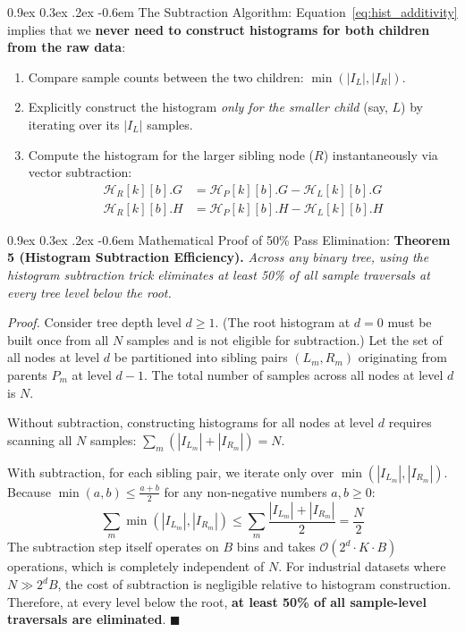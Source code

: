 \documentclass[11pt,a4paper]{article}
\makeatletter
\renewcommand\paragraph{\@startsection{paragraph}{4}{\z@}%
                                     {0.9ex \@plus0.3ex \@minus.2ex}%
                                     {-0.6em}%
                                     {\normalfont\normalsize\bfseries}}
\makeatother
\begin{document}
\paragraph{The Subtraction Algorithm:}
Equation~\eqref{eq:hist_additivity} implies that we \textbf{never need to construct histograms for both children from the raw data}:
\begin{enumerate}
    \item Compare sample counts between the two children: $\min(|I_L|, |I_R|)$.
    \item Explicitly construct the histogram \emph{only for the smaller child} (say, $L$) by iterating over its $|I_L|$ samples.
    \item Compute the histogram for the larger sibling node ($R$) instantaneously via vector subtraction:
    \begin{align}
        \mathcal{H}_R[k][b].G &= \mathcal{H}_P[k][b].G - \mathcal{H}_L[k][b].G \nonumber \\
        \mathcal{H}_R[k][b].H &= \mathcal{H}_P[k][b].H - \mathcal{H}_L[k][b].H
    \end{align}
\end{enumerate}

\paragraph{Mathematical Proof of 50\% Pass Elimination:}
\textbf{Theorem 5 (Histogram Subtraction Efficiency).} \emph{Across any binary tree, using the histogram subtraction trick eliminates at least 50\% of all sample traversals at every tree level below the root.}

\emph{Proof.} Consider tree depth level $d \ge 1$. (The root histogram at $d = 0$ must be built once from all $N$ samples and is not eligible for subtraction.) Let the set of all nodes at level $d$ be partitioned into sibling pairs $(L_m, R_m)$ originating from parents $P_m$ at level $d-1$. The total number of samples across all nodes at level $d$ is $N$.

Without subtraction, constructing histograms for all nodes at level $d$ requires scanning all $N$ samples: $\sum_m (|I_{L_m}| + |I_{R_m}|) = N$.

With subtraction, for each sibling pair, we iterate only over $\min(|I_{L_m}|, |I_{R_m}|)$. Because $\min(a, b) \le \frac{a + b}{2}$ for any non-negative numbers $a, b \ge 0$:
\begin{equation}
    \sum_m \min(|I_{L_m}|, |I_{R_m}|) \le \sum_m \frac{|I_{L_m}| + |I_{R_m}|}{2} = \frac{N}{2}
\end{equation}
The subtraction step itself operates on $B$ bins and takes $\mathcal{O}(2^d \cdot K \cdot B)$ operations, which is completely independent of $N$. For industrial datasets where $N \gg 2^d B$, the cost of subtraction is negligible relative to histogram construction. Therefore, at every level below the root, \textbf{at least 50\% of all sample-level traversals are eliminated}. $\blacksquare$
\end{document}
